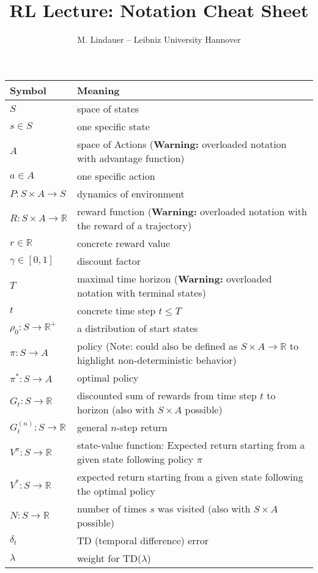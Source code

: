 \documentclass[]{article}
\title{RL Lecture: Notation Cheat Sheet}
\author{M. Lindauer -- Leibniz University Hannover}
\date{}
\begin{document}
\maketitle

\begin{table}[h]
	\centering
	\begin{tabular}{ll}
		\toprule
		\textbf{Symbol} & \textbf{Meaning} \\
		\midrule
		$S$	   & space of states\\
		$s \in S$	   & one specific state\\
		$A$    & space of Actions (\textbf{Warning:} overloaded notation with advantage function)\\
		$a \in A$    & one specific action\\
		$P: S \times A \to S$	   & dynamics of environment \\
		$R: S \times A \to \mathbb{R}$	   & reward function (\textbf{Warning:} overloaded notation with the reward of a trajectory)\\
		$r \in \mathbb{R}$ & concrete reward value\\
		$\gamma \in [0,1]$  & discount factor\\
		$T$	   & maximal time horizon (\textbf{Warning:} overloaded notation with terminal states)\\
		$t$	   & concrete time step $t \leq T$\\
		$\rho_0: S \to \mathbb{R}^+$ & a distribution of start states\\
		$\pi: S \to A$ & policy (Note: could also be defined as $S \times A \to \mathbb{R}$ to highlight non-deterministic behavior)\\
		$\pi^*: S \to A$ & optimal policy\\
		$G_t: S \to \mathbb{R} $ & discounted sum of rewards from time step $t$ to horizon (also with $S \times A$ possible)\\
		$G_t^{(n)}: S \to \mathbb{R} $ & general $n$-step return\\
		$V^\pi: S \to \mathbb{R}$ & state-value function: Expected return starting from a given state following policy $\pi$\\
		$V^* : S \to \mathbb{R}$ & expected return starting from a given state following the optimal policy\\
		$N: S \to \mathbb{R}$ & number of times $s$ was visited (also with $S \times A$ possible)\\
		$\delta_t$ & TD (temporal difference) error \\
		$\lambda$ & weight for TD($\lambda$)\\

\end{tabular}
\end{table}
\end{document}
